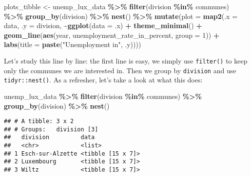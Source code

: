 \documentclass[
]{article}
\newenvironment{Shaded}{\begin{snugshade}}{\end{snugshade}}
\newcommand{\DataTypeTok}[1]{\textcolor[rgb]{0.13,0.29,0.53}{#1}}
\newcommand{\DecValTok}[1]{\textcolor[rgb]{0.00,0.00,0.81}{#1}}
\newcommand{\KeywordTok}[1]{\textcolor[rgb]{0.13,0.29,0.53}{\textbf{#1}}}
\newcommand{\NormalTok}[1]{#1}
\newcommand{\OperatorTok}[1]{\textcolor[rgb]{0.81,0.36,0.00}{\textbf{#1}}}
\newcommand{\StringTok}[1]{\textcolor[rgb]{0.31,0.60,0.02}{#1}}
\begin{document}
\begin{Shaded}
\begin{Highlighting}[]
\NormalTok{plots\_tibble \textless{}{-}}\StringTok{ }\NormalTok{unemp\_lux\_data }\OperatorTok{\%\textgreater{}\%}
\StringTok{  }\KeywordTok{filter}\NormalTok{(division }\OperatorTok{\%in\%}\StringTok{ }\NormalTok{communes) }\OperatorTok{\%\textgreater{}\%}
\StringTok{  }\KeywordTok{group\_by}\NormalTok{(division) }\OperatorTok{\%\textgreater{}\%}
\StringTok{  }\KeywordTok{nest}\NormalTok{() }\OperatorTok{\%\textgreater{}\%}
\StringTok{  }\KeywordTok{mutate}\NormalTok{(}\DataTypeTok{plot =} \KeywordTok{map2}\NormalTok{(}\DataTypeTok{.x =}\NormalTok{ data, }\DataTypeTok{.y =}\NormalTok{ division, }\OperatorTok{\textasciitilde{}}\KeywordTok{ggplot}\NormalTok{(}\DataTypeTok{data =}\NormalTok{ .x) }\OperatorTok{+}
\StringTok{       }\KeywordTok{theme\_minimal}\NormalTok{() }\OperatorTok{+}
\StringTok{       }\KeywordTok{geom\_line}\NormalTok{(}\KeywordTok{aes}\NormalTok{(year, unemployment\_rate\_in\_percent, }\DataTypeTok{group =} \DecValTok{1}\NormalTok{)) }\OperatorTok{+}
\StringTok{       }\KeywordTok{labs}\NormalTok{(}\DataTypeTok{title =} \KeywordTok{paste}\NormalTok{(}\StringTok{"Unemployment in"}\NormalTok{, .y))))}
\end{Highlighting}
\end{Shaded}

Let's study this line by line: the first line is easy, we simply use \texttt{filter()} to keep only the
communes we are interested in. Then we group by \texttt{division} and use \texttt{tidyr::nest()}. As a refresher,
let's take a look at what this does:

\begin{Shaded}
\begin{Highlighting}[]
\NormalTok{unemp\_lux\_data }\OperatorTok{\%\textgreater{}\%}
\StringTok{  }\KeywordTok{filter}\NormalTok{(division }\OperatorTok{\%in\%}\StringTok{ }\NormalTok{communes) }\OperatorTok{\%\textgreater{}\%}
\StringTok{  }\KeywordTok{group\_by}\NormalTok{(division) }\OperatorTok{\%\textgreater{}\%}
\StringTok{  }\KeywordTok{nest}\NormalTok{()}
\end{Highlighting}
\end{Shaded}

\begin{verbatim}
## # A tibble: 3 x 2
## # Groups:   division [3]
##   division         data             
##   <chr>            <list>           
## 1 Esch-sur-Alzette <tibble [15 x 7]>
## 2 Luxembourg       <tibble [15 x 7]>
## 3 Wiltz            <tibble [15 x 7]>
\end{verbatim}
\end{document}
